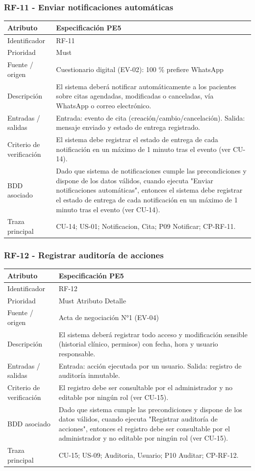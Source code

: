 \documentclass[11pt,a4paper]{article}
\begin{document}
	\subsubsection{RF-11 - Enviar notificaciones automáticas}
	\begin{tabularx}{\textwidth}{p{3.2cm}Y}
		\toprule
		\textbf{Atributo} & \textbf{Especificación PE5}\\\midrule
		Identificador & RF-11\\
		Prioridad & Must\\
		Fuente / origen & Cuestionario digital (EV-02): 100 \% prefiere WhatsApp\\
		Descripción & El sistema deberá notificar automáticamente a los pacientes sobre citas agendadas, modificadas o canceladas, vía WhatsApp o correo electrónico.\\
		Entradas / salidas & Entrada: evento de cita (creación/cambio/cancelación). Salida: mensaje enviado y estado de entrega registrado.\\
		Criterio de verificación & El sistema debe registrar el estado de entrega de cada notificación en un máximo de 1 minuto tras el evento (ver CU-14).\\
		BDD asociado & Dado que sistema de notificaciones cumple las precondiciones y dispone de los datos válidos, cuando ejecuta "Enviar notificaciones automáticas", entonces el sistema debe registrar el estado de entrega de cada notificación en un máximo de 1 minuto tras el evento (ver CU-14).\\
		Traza principal & CU-14; US-01; Notificacion, Cita; P09 Notificar; CP-RF-11.\\
		\bottomrule
	\end{tabularx}
\subsubsection{RF-12 - Registrar auditoría de acciones}
	\begin{tabularx}{\textwidth}{p{3.2cm}Y}
		\toprule
		\textbf{Atributo} & \textbf{Especificación PE5}\\\midrule
		Identificador & RF-12\\
		Prioridad & Must Atributo Detalle\\
		Fuente / origen & Acta de negociación N°1 (EV-04)\\
		Descripción & El sistema deberá registrar todo acceso y modificación sensible (historial clínico, permisos) con fecha, hora y usuario responsable.\\
		Entradas / salidas & Entrada: acción ejecutada por un usuario. Salida: registro de auditoría inmutable.\\
		Criterio de verificación & El registro debe ser consultable por el administrador y no editable por ningún rol (ver CU-15).\\
		BDD asociado & Dado que sistema cumple las precondiciones y dispone de los datos válidos, cuando ejecuta "Registrar auditoría de acciones", entonces el registro debe ser consultable por el administrador y no editable por ningún rol (ver CU-15).\\
		Traza principal & CU-15; US-09; Auditoria, Usuario; P10 Auditar; CP-RF-12.\\
		\bottomrule
	\end{tabularx}
	\clearpage
\end{document}
